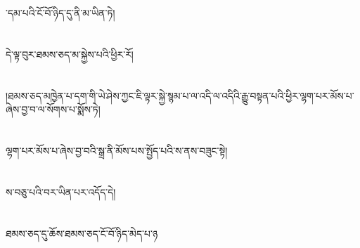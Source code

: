 ་དམ་པའི་ངོ་བོ་ཉིད་དུ་ནི་མ་ཡིན་ཏེ།\chapter{ }དེ་ལྟ་བུར་ཐམས་ཅད་མ་སྐྱེས་པའི་ཕྱིར་རོ།\chapter{ }།ཐམས་ཅད་མཁྱེན་པ་དག་གི་ཡེ་ཤེས་ཀྱང་ཇི་ལྟར་སྐྱེ་སྙམ་པ་ལ་འདི་ལ་འདིའི་རྒྱུ་བསྟན་པའི་ཕྱིར་ལྷག་པར་མོས་པ་ཞེས་བྱ་བ་ལ་སོགས་པ་སྨོས་ཏེ།\chapter{ }ལྷག་པར་མོས་པ་ཞེས་བྱ་བའི་སྒྲ་ནི་མོས་པས་སྤྱོད་པའི་ས་ནས་བཟུང་སྟེ།\chapter{ }ས་བཅུ་པའི་བར་ཡིན་པར་འདོད་དེ།\chapter{ }ཐམས་ཅད་དུ་ཆོས་ཐམས་ཅད་ངོ་བོ་ཉིད་མེད་པ་ཉ